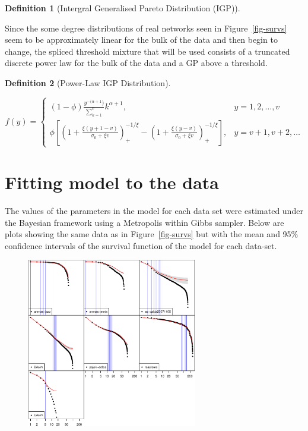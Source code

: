\documentclass[
  10pt,
  a4paper,
]{scrreprt}
\theoremstyle{plain}
\theoremstyle{plain}
\theoremstyle{plain}
\theoremstyle{definition}
\newtheorem{definition}{Definition}[section]
\theoremstyle{remark}
\begin{document}
{\begin{definition}[Intergral Generalised Pareto Distribution
(IGP)]
\end{definition}

Since the some degree distributions of real networks seen in
Figure~\ref{fig-survs} seem to be approximately linear for the bulk of
the data and then begin to change, the spliced threshold mixture that
will be used consists of a truncated discrete power law for the bulk of
the data and a GP above a threshold.

\begin{definition}[Power-Law IGP
Distribution]\protect\hypertarget{def-pligp}{}\label{def-pligp}

\[
f(y) = \begin{cases}
(1-\phi)\displaystyle\frac{y^{-(\alpha+1})}{\sum_{k=1}^v}k^{\alpha+1}, & y=1,2,\ldots, v\\
\phi\left[\left(1+\displaystyle\frac{\xi(y+1-v)}{\sigma_0+\xi v}\right)_+^{-1/\xi}-\left(1+\displaystyle\frac{\xi(y-v)}{\sigma_0+\xi v}\right)_+^{-1/\xi}\right],&y=v+1, v+2,\ldots
\end{cases}
\]

\end{definition}

\hypertarget{fitting-model-to-the-data}{%
\section{Fitting model to the data}\label{fitting-model-to-the-data}}

The values of the parameters in the model for each data set were
estimated under the Bayesian framework using a Metropolis within Gibbs
sampler. Below are plots showing the same data as in
Figure~\ref{fig-survs} but with the mean and 95\% confidence intervals
of the survival function of the model for each data-set.

\begin{figure}[H]

{\centering \includegraphics[width=0.66\textwidth,height=\textheight]{doc_files/figure-pdf/fig-fits1-1.pdf}

}
\end{figure}}
\end{document}
